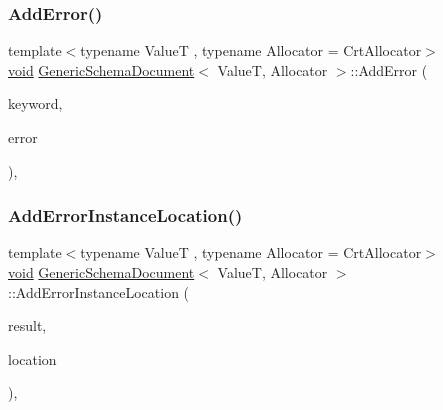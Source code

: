 \mbox{\label{classGenericSchemaDocument_a28c66c5092582dd64225d1a534098266}} 
\subsubsection{\texorpdfstring{Add\+Error()}{AddError()}}
{\footnotesize\ttfamily template$<$typename ValueT , typename Allocator  = Crt\+Allocator$>$ \\
\hyperlink{imgui__impl__opengl3__loader_8h_ac668e7cffd9e2e9cfee428b9b2f34fa7}{void} \hyperlink{classGenericSchemaDocument}{Generic\+Schema\+Document}$<$ ValueT, Allocator $>$\+::Add\+Error (\begin{DoxyParamCaption}\item[{\hyperlink{classGenericSchemaDocument_a777505b09fff6cf23b8cfed9e0350eec}{G\+Value} \&}]{keyword,  }\item[{\hyperlink{classGenericSchemaDocument_a777505b09fff6cf23b8cfed9e0350eec}{G\+Value} \&}]{error }\end{DoxyParamCaption})\hspace{0.3cm}{\ttfamily [inline]}, {\ttfamily [private]}}

\mbox{\label{classGenericSchemaDocument_accef2a20f4db6fc878ebdedbc0b39abb}} 
\subsubsection{\texorpdfstring{Add\+Error\+Instance\+Location()}{AddErrorInstanceLocation()}}
{\footnotesize\ttfamily template$<$typename ValueT , typename Allocator  = Crt\+Allocator$>$ \\
\hyperlink{imgui__impl__opengl3__loader_8h_ac668e7cffd9e2e9cfee428b9b2f34fa7}{void} \hyperlink{classGenericSchemaDocument}{Generic\+Schema\+Document}$<$ ValueT, Allocator $>$\+::Add\+Error\+Instance\+Location (\begin{DoxyParamCaption}\item[{\hyperlink{classGenericSchemaDocument_a777505b09fff6cf23b8cfed9e0350eec}{G\+Value} \&}]{result,  }\item[{const \hyperlink{classGenericSchemaDocument_aeb62f562d4dc024402b00f97cbcef747}{Pointer\+Type} \&}]{location }\end{DoxyParamCaption})\hspace{0.3cm}{\ttfamily [inline]}, {\ttfamily [private]}}


